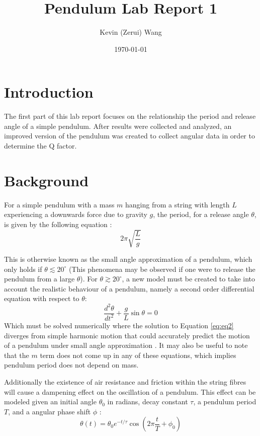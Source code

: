 \documentclass[12pt]{article}
\title{Pendulum Lab Report 1}
\author{Kevin (Zerui) Wang}
\date{\today}
\begin{document}

\maketitle


\section{Introduction}
The first part of this lab report focuses on the relationship the period and release angle of a simple pendulum. After results were collected and analyzed, an improved version of the pendulum was created to collect angular data in order to determine the Q factor.

\section{Background} \label{Background}
For a simple pendulum with a mass $m$ hanging from a string with length $L$ experiencing a downwards force due to gravity $g$, the period, for a release angle $\theta$, is given by the following equation \cite{the-simple-pendulum}:
\begin{equation} \label{eq:eq1}
    2\pi \sqrt{\frac{L}{g}}
\end{equation}

This is otherwise known as the small angle approximation of a pendulum, which only holds if $\theta \lesssim 20^{\circ}$ \cite{the-simple-pendulum} (This phenomena may be observed if one were to release the pendulum from a large $\theta$). For $\theta \gtrsim 20^{\circ}$, a new model must be created to take into account the realistic behaviour of a pendulum, namely a second order differential equation with respect to $\theta$:
\begin{equation} \label{eq:eq2}
    \frac{d^2\theta}{dt^2} + \frac{g}{L}\sin{\theta} = 0
\end{equation}
Which must be solved numerically where the solution to Equation \ref{eq:eq2} diverges from simple harmonic motion that could accurately predict the motion of a pendulum under small angle approximation \cite{the-simple-pendulum}. It may also be useful to note that the $m$ term does not come up in any of these equations, which implies pendulum period does not depend on mass.

Additionally the existence of air resistance and friction within the string fibres will cause a dampening effect on the oscillation of a pendulum. This effect can be modeled given an initial angle $\theta_0$ in radians, decay constant $\tau$, a pendulum period $T$, and a angular phase shift $\phi$ \cite{damped-oscillations}:
\begin{equation}
    \theta(t) = \theta_0 e^{-{t/\tau}} \cos\left(2\pi\frac{t}{T} + \phi_0\right)
\end{equation}
\end{document}
